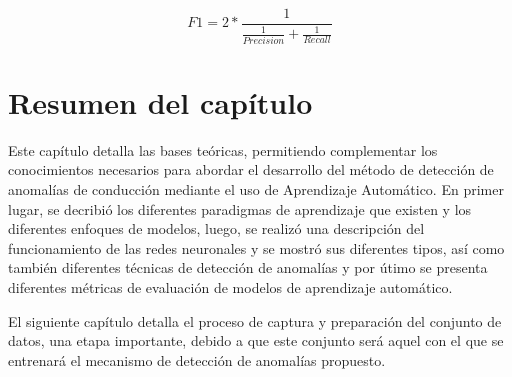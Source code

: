 \begin{equation}
F1 = 2*\frac{1}{\frac{1}{Precision}+\frac{1}{Recall}}
\end{equation}

\section{Resumen del cap\'{i}tulo}

Este cap\'{i}tulo detalla las bases te\'{o}ricas, permitiendo complementar los conocimientos necesarios para abordar el desarrollo del m\'{e}todo de detecci\'{o}n de anomal\'{i}as de conducci\'{o}n mediante el uso de Aprendizaje Autom\'{a}tico. En primer lugar, se decribi\'{o} los diferentes paradigmas de aprendizaje que existen y los diferentes enfoques de modelos, luego, se realiz\'{o} una descripci\'{o}n del funcionamiento de las redes neuronales y se mostr\'{o} sus diferentes tipos, as\'{i} como tambi\'{e}n diferentes t\'{e}cnicas de detecci\'{o}n de anomal\'{i}as y por \'{u}timo se presenta diferentes m\'{e}tricas de evaluaci\'{o}n de modelos de aprendizaje autom\'{a}tico. 

El siguiente cap\'{i}tulo detalla el proceso de captura y preparaci\'{o}n del conjunto de datos, una etapa importante, debido a que este conjunto ser\'{a} aquel con el que se entrenar\'{a} el mecanismo de detecci\'{o}n de anomal\'{i}as propuesto.